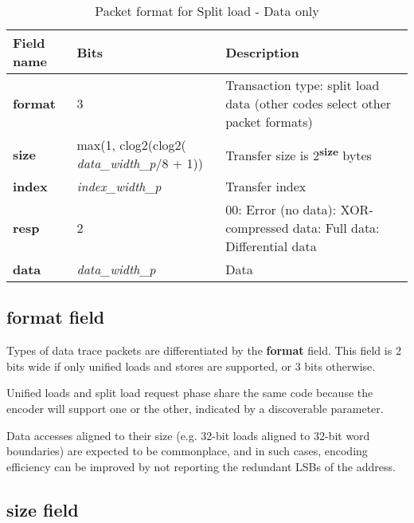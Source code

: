 \begin{table}[htp]
  \centering
  \caption{Packet format for Split load - Data only}
  \label{tab:te_datadx0y4}
  \begin{tabulary}{\textwidth}{|l|p{38mm}|p{92mm}|}
    \hline
    {\bf Field name} & {\bf Bits} & {\bf Description} \\
    \hline
    \textbf{format} & 	3	& Transaction type: split load data\newline	
		(other codes select other packet formats)\\
    \hline
    \textbf{size} & max(1, clog2(clog2( \textit{data\_width\_p}/8 + 1)) & Transfer size is 2\textsuperscript{\textbf{size}} bytes \\
    \hline
    \textbf{index} & \textit{index\_width\_p} & Transfer index\\
    \hline
    \textbf{resp} & 	2	& 
		00: Error (no data): XOR-compressed data: Full data: Differential data\\
    \hline
    \textbf{data} & \textit{data\_width\_p} & 
                Data\\
    \hline
  \end{tabulary}
\end{table}

\subsection{format field} \label{sec:loadstore-format}

Types of data trace packets are differentiated by the \textbf{format} field.  This field is 2 bits wide if
only unified loads and stores are supported, or 3 bits otherwise.

Unified loads and split load request phase share the same code because the encoder will support one or the 
other, indicated by a discoverable parameter.

Data accesses aligned to their size (e.g. 32-bit loads aligned to 32-bit word boundaries) are expected to
be commonplace, and in such cases, encoding efficiency can be improved by not reporting the redundant LSBs of the address.

\subsection{size field} \label{sec:loadstore-size}

